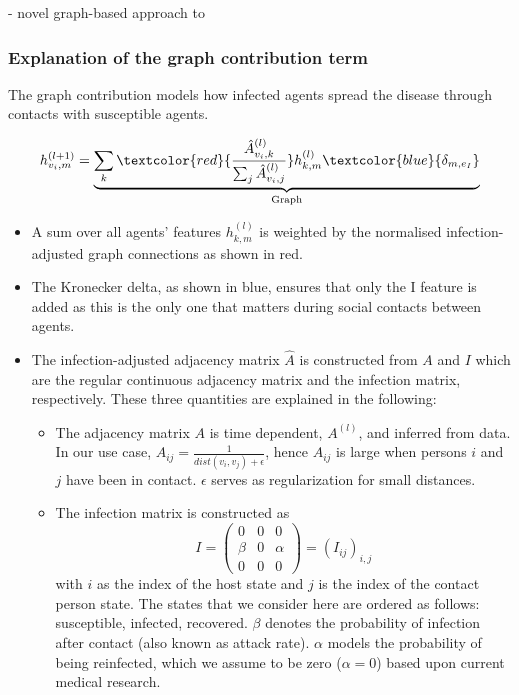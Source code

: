 - novel graph-based approach to

\subsubsection{Explanation of the graph contribution term}
The graph contribution models how infected agents spread the disease through contacts with susceptible agents.

\begin{equation}
h_{v_i, m}^{(l+1)}
=
\underbrace{
	\sum_k \textcolor{red}{\frac{\hat{A}_{v_i, k}^{(l)}}{\sum_j \hat{A}_{v_i, j}^{(l)}}} h_{k, m}^{(l)} \textcolor{blue}{\delta_{m, e_I}}
}_{\text{Graph}}
\end{equation}

\begin{itemize}
	\item A sum over all agents' features $h_{k,m}^{(l)}$ is weighted by the normalised infection-adjusted graph connections as shown in red.
	\item The Kronecker delta, as shown in blue, ensures that only the I feature is added as this is the only one that matters during social contacts between agents.
	\item The infection-adjusted adjacency matrix $\hat{A}$ is constructed from $A$ and $I$ which are the regular continuous adjacency matrix and the infection matrix, respectively. These three quantities are explained in the following:
	\begin{itemize}
		\item The adjacency matrix $A$ is time dependent, $A^{(l)}$, and inferred from data. In our use case, $A_{ij} = \frac{1}{dist(v_i, v_j)+\epsilon}$, hence $A_{ij}$ is large when persons $i$ and $j$ have been in contact. $\epsilon$ serves as regularization for small distances.
		\item The infection matrix is constructed as
		\begin{equation}
		I =
		\begin{pmatrix}
		0     &  0  & 0 \\
		\beta &  0  & \alpha \\
		0     &  0  & 0
		\end{pmatrix}
		=
		(I_{ij})_{i,j}
		\end{equation}
		with $i$ as the index of the host state and $j$ is the index of the contact person state. The states that we consider here are ordered as follows: susceptible, infected, recovered. $\beta$ denotes the probability of infection  after contact (also known as attack rate). $\alpha$ models the probability of being reinfected, which we assume to be zero ($\alpha=0$) based upon current medical research.

\end{itemize}
\end{itemize}
